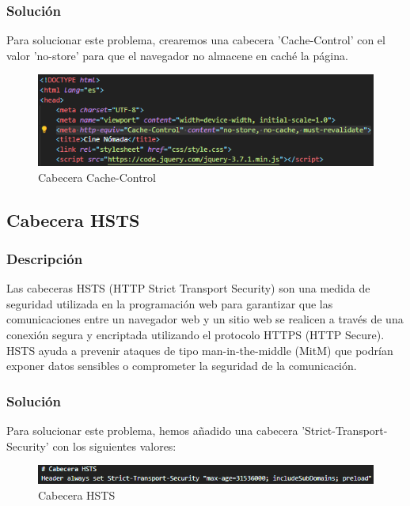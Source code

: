 \documentclass{report}
\begin{document}
                \subsubsection{Solución}
                    Para solucionar este problema, crearemos una cabecera 'Cache-Control' con el valor 'no-store' para que el navegador no almacene en caché la página.
                    \begin{figure}[H]
                        \centering
                        \includegraphics[width=\textwidth]{./img/vulnerabilidades/3.5/3.1.png}
                        \caption{Cabecera Cache-Control}
                    \end{figure}
            \clearpage
            \subsection{Cabecera HSTS}
                \subsubsection{Descripción}
                    Las cabeceras HSTS (HTTP Strict Transport Security) son una medida de seguridad utilizada en la programación web para garantizar que las comunicaciones entre un navegador web y un sitio web se realicen a través de una conexión segura y encriptada utilizando el protocolo HTTPS (HTTP Secure). HSTS ayuda a prevenir ataques de tipo man-in-the-middle (MitM) que podrían exponer datos sensibles o comprometer la seguridad de la comunicación.
                \subsubsection{Solución}
                    Para solucionar este problema, hemos añadido una cabecera 'Strict-Transport-Security' con los siguientes valores:
                    \begin{figure}[H]
                        \centering
                        \includegraphics[width=\textwidth]{./img/vulnerabilidades/3.5/4.1.png}
                        \caption{Cabecera HSTS}
                    \end{figure}
            \clearpage
\end{document}
